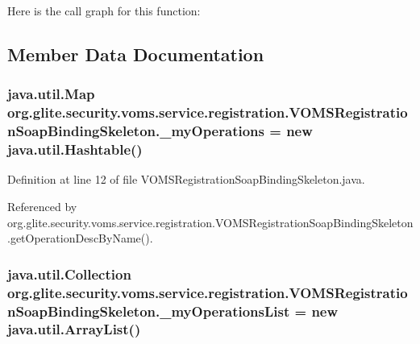 Here is the call graph for this function:




\subsection{Member Data Documentation}
\hypertarget{classorg_1_1glite_1_1security_1_1voms_1_1service_1_1registration_1_1VOMSRegistrationSoapBindingSkeleton_aa295c1e9707c7c93e37c1201b060e05f}{
\subsubsection[{\_\-myOperations}]{\setlength{\rightskip}{0pt plus 5cm}java.util.Map {\bf org.glite.security.voms.service.registration.VOMSRegistrationSoapBindingSkeleton.\_\-myOperations} = new java.util.Hashtable()}}
\label{classorg_1_1glite_1_1security_1_1voms_1_1service_1_1registration_1_1VOMSRegistrationSoapBindingSkeleton_aa295c1e9707c7c93e37c1201b060e05f}


Definition at line 12 of file VOMSRegistrationSoapBindingSkeleton.java.



Referenced by org.glite.security.voms.service.registration.VOMSRegistrationSoapBindingSkeleton.getOperationDescByName().

\hypertarget{classorg_1_1glite_1_1security_1_1voms_1_1service_1_1registration_1_1VOMSRegistrationSoapBindingSkeleton_add77f4ac2e5f9e1986b4205266a634d1}{
\subsubsection[{\_\-myOperationsList}]{\setlength{\rightskip}{0pt plus 5cm}java.util.Collection {\bf org.glite.security.voms.service.registration.VOMSRegistrationSoapBindingSkeleton.\_\-myOperationsList} = new java.util.ArrayList()}}
\label{classorg_1_1glite_1_1security_1_1voms_1_1service_1_1registration_1_1VOMSRegistrationSoapBindingSkeleton_add77f4ac2e5f9e1986b4205266a634d1}



